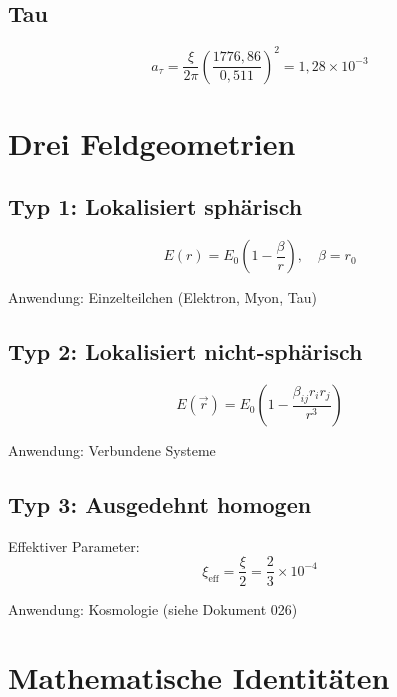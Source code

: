 	\subsection{Tau}
	
	\begin{equation}
		a_\tau = \frac{\xi}{2\pi} \left(\frac{1776{,}86}{0{,}511}\right)^2 = 1{,}28 \times 10^{-3}
	\end{equation}
	
	\section{Drei Feldgeometrien}
	\label{sec:field_geometries}
	
	\subsection{Typ 1: Lokalisiert sphärisch}
	
	\begin{equation}
		E(r) = E_0 \left(1 - \frac{\beta}{r}\right), \quad \beta = r_0
	\end{equation}
	
	Anwendung: Einzelteilchen (Elektron, Myon, Tau)
	
	\subsection{Typ 2: Lokalisiert nicht-sphärisch}
	
	\begin{equation}
		E(\vec{r}) = E_0 \left(1 - \frac{\beta_{ij} r_i r_j}{r^3}\right)
	\end{equation}
	
	Anwendung: Verbundene Systeme
	
	\subsection{Typ 3: Ausgedehnt homogen}
	
	Effektiver Parameter:
	\begin{equation}
		\xi_{\text{eff}} = \frac{\xi}{2} = \frac{2}{3} \times 10^{-4}
	\end{equation}
	
	Anwendung: Kosmologie (siehe Dokument 026)
	
	\section{Mathematische Identitäten}
	\label{sec:identities}
	
